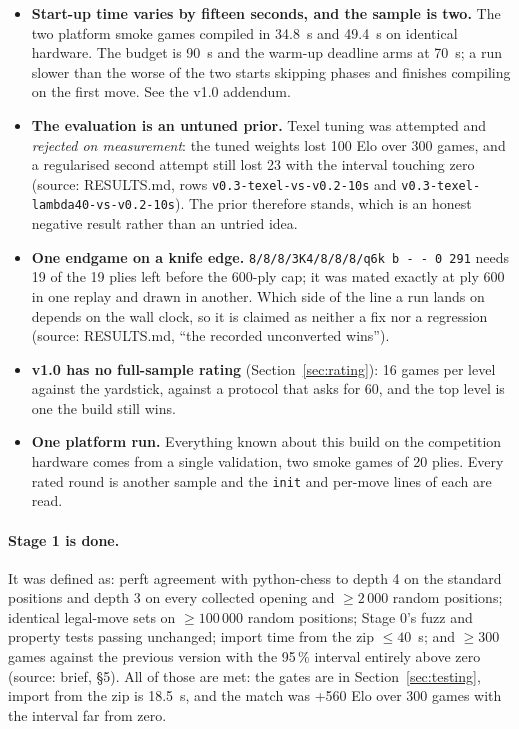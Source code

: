 \documentclass[11pt,a4paper]{article}
\newcommand{\src}[1]{{\small(source: #1)}}
\newcommand{\code}[1]{\texttt{#1}}
\begin{document}
\begin{itemize}[nosep]
        \emph{Status.} A king-danger term counting attackers into the king's zone has since been
        written and is on the development branch, gated on the parity comparison against the Python
        evaluation like every other term \src{DECISIONS.md, 2026-09-08, ``A king-danger term''}. It is
        \textbf{not in v1.0}, which is the build this report describes and the build that has played,
        and it has not yet won a promotion match, so nothing is claimed for it here.
  \item \textbf{Start-up time varies by fifteen seconds, and the sample is two.} The two platform smoke
        games compiled in 34.8~s and 49.4~s on identical hardware. The budget is 90~s and the warm-up
        deadline arms at 70~s; a run slower than the worse of the two starts skipping phases and finishes
        compiling on the first move. See the v1.0 addendum.
  \item \textbf{The evaluation is an untuned prior.} Texel tuning was attempted and \emph{rejected on
        measurement}: the tuned weights lost 100 Elo over 300 games, and a regularised second attempt
        still lost 23 with the interval touching zero \src{RESULTS.md, rows \code{v0.3-texel-vs-v0.2-10s}
        and \code{v0.3-texel-lambda40-vs-v0.2-10s}}. The prior therefore stands, which is an honest
        negative result rather than an untried idea.
  \item \textbf{One endgame on a knife edge.} \code{8/8/8/3K4/8/8/8/q6k b - - 0 291} needs 19 of the 19
        plies left before the 600-ply cap; it was mated exactly at ply 600 in one replay and drawn in
        another. Which side of the line a run lands on depends on the wall clock, so it is claimed as
        neither a fix nor a regression \src{RESULTS.md, ``the recorded unconverted wins''}.
  \item \textbf{v1.0 has no full-sample rating} (Section~\ref{sec:rating}): 16 games per level against
        the yardstick, against a protocol that asks for 60, and the top level is one the build still wins.
  \item \textbf{One platform run.} Everything known about this build on the competition hardware comes
        from a single validation, two smoke games of 20 plies. Every rated round is another sample and the
        \code{init} and per-move lines of each are read.
\end{itemize}
\paragraph{Stage 1 is done.} It was defined as: perft agreement with python-chess to depth 4 on the
standard positions and depth 3 on every collected opening and $\geq 2\,000$ random positions; identical
legal-move sets on $\geq 100\,000$ random positions; Stage 0's fuzz and property tests passing unchanged;
import time from the zip $\leq 40$~s; and $\geq 300$ games against the previous version with the 95\,\%
interval entirely above zero \src{brief, \S 5}. All of those are met: the gates are in
Section~\ref{sec:testing}, import from the zip is 18.5~s, and the match was +560 Elo over 300 games with
the interval far from zero.
\end{document}
